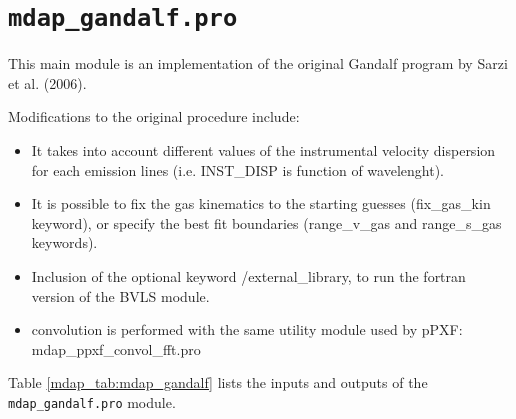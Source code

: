 \section{{\tt mdap\_gandalf.pro}}
\label{dap_sec:mdap_gandalf}

This main module is an implementation of the original Gandalf program by
Sarzi et al. (2006). 

Modifications to the original procedure include:

\begin{itemize}

   \item It takes into account different values of the instrumental
     velocity dispersion for each emission lines (i.e. INST\_DISP is
     function of wavelenght).

   \item It is possible to fix the gas kinematics to the starting
     guesses (fix\_gas\_kin keyword), or specify the best fit
     boundaries (range\_v\_gas and range\_s\_gas keywords).

   \item Inclusion of the optional keyword /external\_library, to run
     the fortran version of the BVLS module.

   \item convolution is performed with the same utility module used by
     pPXF: mdap\_ppxf\_convol\_fft.pro

\end{itemize}

Table \ref{mdap_tab:mdap_gandalf} lists the inputs and outputs of the
{\tt mdap\_gandalf.pro} module.

